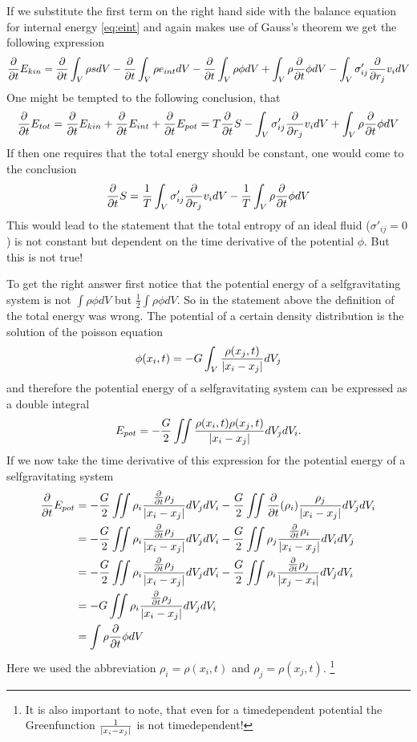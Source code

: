 If we substitute the first term on the right hand side with the balance equation
for internal energy \eqref{eq:eint} and again makes use of Gauss's theorem we
get the following expression
\begin{align}
\frac{\partial}{\partial t} E_{kin} = \frac{\partial}{\partial t} \int_V \rho s dV -\frac{\partial}{\partial t} \int_V \rho e_{int} dV
- \frac{\partial}{\partial t} \int_V\rho \phi dV + \int_V \rho \frac{\partial}{\partial t} \phi dV 
- \int_V \sigma'_{ij} \frac{\partial}{\partial r_j} v_i dV \label{eq:glodis}
\end{align}
One might be tempted to the following conclusion, that
\begin{align}
\frac{\partial}{\partial t} E_{tot} = 
\frac{\partial}{\partial t} E_{kin}+\frac{\partial}{\partial t} E_{int}+\frac{\partial}{\partial t} E_{pot} = 
T \frac{\partial}{\partial t} S - \int_V \sigma'_{ij} \frac{\partial}{\partial r_j} v_i dV + \int_V \rho \frac{\partial}{\partial t} \phi dV 
\end{align}
If then one requires that the total energy should be constant, one would come
to the conclusion
\begin{align}
\frac{\partial}{\partial t} S = \frac{1}{T}\int_V \sigma'_{ij} \frac{\partial}{\partial r_j} v_i dV 
- \frac{1}{T} \int_V \rho \frac{\partial}{\partial t} \phi dV
\end{align}
This would lead to the statement that the total entropy of an ideal fluid
($\sigma'_{ij}=0$) is not constant but dependent on the time derivative of the
potential $\phi$. But this is not true!

To get the right answer first notice that the potential energy of a
selfgravitating system is not $\int \rho \phi dV$ but $\frac{1}{2}\int \rho
\phi dV$. So in the statement above the definition of the total energy was
wrong. The potential of a certain density distribution is the solution of the
poisson equation
\begin{align}
\phi(x_i,t)=-G \int_V \frac{\rho(x_j,t)}{\left\lvert x_i-x_j\right\rvert} dV_j
\end{align}
and therefore the potential energy of a selfgravitating system can be expressed
as a double integral
\begin{align}
E_{pot}=-\frac{G}{2}\iint \frac{\rho(x_i,t)\rho(x_j,t)}{\left\lvert x_i-x_j\right\rvert}dV_j dV_i.
\end{align}
If we now take the time derivative of this expression for the potential energy
of a selfgravitating system
\begin{align}
\begin{split}
\frac{\partial}{\partial t}E_{pot}&=
-\frac{G}{2} \iint \rho_i \frac{\frac{\partial}{\partial t}\rho_j}{\left\lvert x_i-x_j\right\rvert}dV_j dV_i
-\frac{G}{2} \iint \frac{\partial}{\partial t}(\rho_i)\frac{\rho_j}{\left\lvert x_i-x_j\right\rvert}dV_j dV_i\\
&=
-\frac{G}{2} \iint \rho_i \frac{\frac{\partial}{\partial t}\rho_j}{\left\lvert x_i-x_j\right\rvert}dV_j dV_i
-\frac{G}{2} \iint \rho_j \frac{\frac{\partial}{\partial t}\rho_i}{\left\lvert x_i-x_j\right\rvert}dV_i dV_j\\
&=
-\frac{G}{2} \iint \rho_i \frac{\frac{\partial}{\partial t}\rho_j}{\left\lvert x_i-x_j\right\rvert}dV_j dV_i
-\frac{G}{2} \iint \rho_i \frac{\frac{\partial}{\partial t}\rho_j}{\left\lvert x_j-x_i\right\rvert}dV_j dV_i\\
&=
-G \iint \rho_i \frac{\frac{\partial}{\partial t}\rho_j}{\left\lvert x_i-x_j\right\rvert}dV_j dV_i \\
&=
\int \rho \frac{\partial}{\partial t} \phi dV
\end{split}
\end{align}
Here we used the abbreviation $\rho_i=\rho(x_i,t)$ and $\rho_j=\rho(x_j,t)$.
\footnote{It is also important to note, that even for a timedependent
potential the Greenfunction $\frac{1}{\left\lvert x_i-x_j\right\rvert}$
is not timedependent!}

